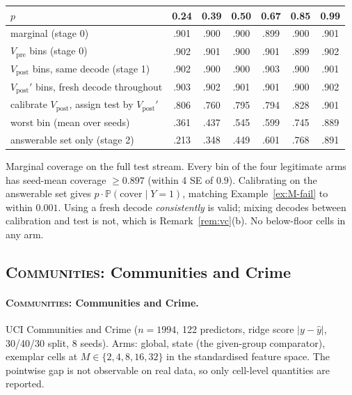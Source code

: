 \documentclass[11pt]{article}
\theoremstyle{definition}
\theoremstyle{remark}
\renewcommand{\P}{\mathbb{P}}
\newcommand{\1}{\mathbf{1}}
\newcommand{\expname}[1]{\textsc{#1}}
\begin{document}
\begin{center}\small
\begin{tabular}{lcccccc}
\toprule
$p$ & 0.24 & 0.39 & 0.50 & 0.67 & 0.85 & 0.99\\
\midrule
marginal (stage 0)              & .901 & .900 & .900 & .899 & .900 & .901\\
$V_{\mathrm{pre}}$ bins (stage 0)  & .902 & .901 & .900 & .901 & .899 & .902\\
$V_{\mathrm{post}}$ bins, same decode (stage 1) & .902 & .900 & .900 & .903 & .900 & .901\\
$V_{\mathrm{post}}'$ bins, fresh decode throughout & .903 & .902 & .901 & .901 & .900 & .902\\
calibrate $V_{\mathrm{post}}$, assign test by $V_{\mathrm{post}}'$ & .806 & .760 & .795 & .794 & .828 & .901\\
\quad worst bin (mean over seeds) & .361 & .437 & .545 & .599 & .745 & .889\\
answerable set only (stage 2)   & .213 & .348 & .449 & .601 & .768 & .891\\
\bottomrule
\end{tabular}
\end{center}
Marginal coverage on the full test stream. Every bin of the four legitimate arms has
seed-mean coverage $\ge 0.897$ (within 4 SE of $0.9$). Calibrating on the answerable set gives
$p\cdot\P(\text{cover}\mid Y{=}1)$, matching Example~\ref{ex:M-fail} to within $0.001$.
Using a fresh decode \emph{consistently} is valid; mixing decodes between calibration and test
is not, which is Remark~\ref{rem:vc}(b). No below-floor cells in any arm.


\subsection{\expname{Communities}: Communities and Crime}
\paragraph{\expname{Communities}: Communities and Crime.}
UCI Communities and Crime \citep{redmond2002communities} ($n=1994$, 122 predictors, ridge score $|y-\hat y|$, 30/40/30
split, 8 seeds). Arms: global, state (the given-group comparator), exemplar cells at
$M\in\{2,4,8,16,32\}$ in the standardised feature space. The pointwise gap is not observable
on real data, so only cell-level quantities are reported. 
\end{document}
